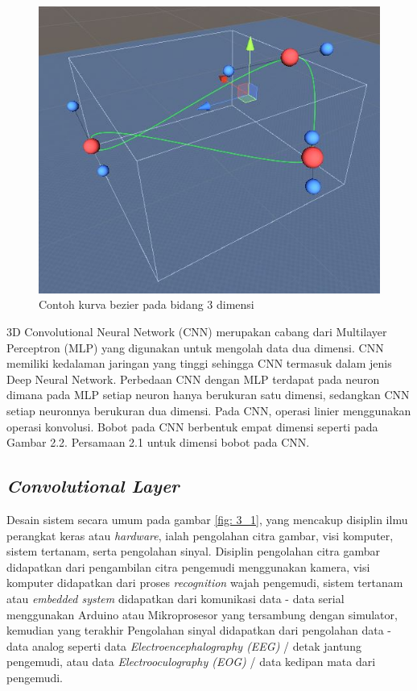 \begin{figure} [H]
	\captionsetup{justification=centering}
	\includegraphics[scale=0.2]{img/contoh-kurva-bezier.JPG}
	\caption{Contoh kurva bezier pada bidang 3 dimensi}
	\label{fig:2.1}
\end{figure}

3D Convolutional Neural Network (CNN) merupakan cabang dari Multilayer Perceptron (MLP) yang digunakan untuk mengolah
data dua dimensi. CNN memiliki kedalaman jaringan yang tinggi
sehingga CNN termasuk dalam jenis Deep Neural Network. Perbedaan CNN dengan MLP terdapat pada neuron dimana pada MLP
setiap neuron hanya berukuran satu dimensi, sedangkan CNN setiap neuronnya berukuran dua dimensi. Pada CNN, operasi linier
menggunakan operasi konvolusi. Bobot pada CNN berbentuk empat dimensi seperti pada Gambar 2.2. Persamaan 2.1 untuk dimensi
bobot pada CNN.
\vspace{1ex}

\subsection{\textit{Convolutional Layer}}
Desain sistem secara umum pada gambar \ref{fig: 3_1}, yang mencakup disiplin ilmu perangkat keras atau \textit{hardware}, ialah pengolahan citra gambar, visi komputer, sistem tertanam, serta pengolahan sinyal. Disiplin pengolahan citra gambar didapatkan dari pengambilan citra pengemudi menggunakan kamera, visi komputer didapatkan dari proses \textit{recognition} wajah pengemudi, sistem tertanam atau \textit{embedded system} didapatkan dari komunikasi data - data serial menggunakan Arduino atau Mikroprosesor yang tersambung dengan simulator, kemudian yang terakhir Pengolahan sinyal didapatkan dari pengolahan data - data analog seperti data \textit{Electroencephalography (EEG)} / detak jantung pengemudi, atau data \textit{Electrooculography (EOG)} / data kedipan mata dari pengemudi.
\vspace{1ex}

